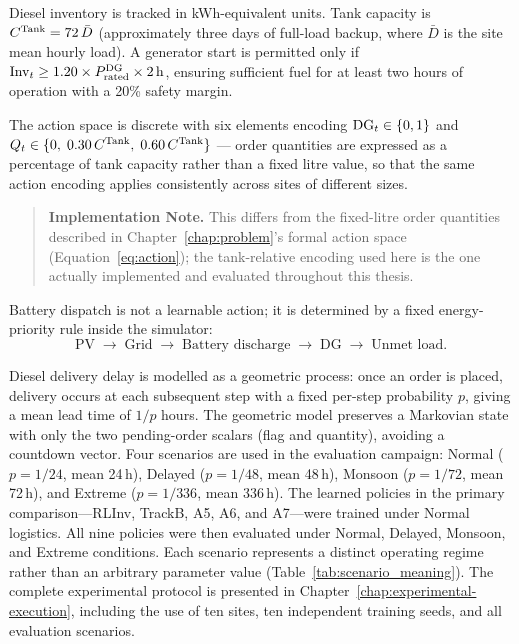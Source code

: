 Diesel inventory is tracked in kWh-equivalent units. Tank capacity is
$C^{\mathrm{Tank}} = 72\,\bar{D}$ (approximately three days of full-load backup,
where $\bar{D}$ is the site mean hourly load). A generator start is
permitted only if
$\mathrm{Inv}_t \geq 1.20 \times P_{\mathrm{rated}}^{\mathrm{DG}} \times 2\,\mathrm{h}$,
ensuring sufficient fuel for at least two hours of operation with a 20\%
safety margin.

The action space is discrete with six elements encoding
$\mathrm{DG}_t \in \{0,1\}$ and $Q_t \in \{0,\;0.30\,C^{\mathrm{Tank}},\;0.60\,C^{\mathrm{Tank}}\}$
--- order quantities are expressed as a percentage of tank capacity rather
than a fixed litre value, so that the same action encoding applies
consistently across sites of different sizes.

\begin{quote}
\textbf{Implementation Note.} This differs from the fixed-litre order
quantities described in Chapter~\ref{chap:problem}'s formal action space
(Equation~\ref{eq:action}); the tank-relative encoding used here is the
one actually implemented and evaluated throughout this thesis.
\end{quote}

Battery
dispatch is not a learnable action; it is determined by a fixed
energy-priority rule inside the simulator:
\[
\text{PV} \;\to\; \text{Grid} \;\to\; \text{Battery discharge}
\;\to\; \text{DG} \;\to\; \text{Unmet load.}
\]

Diesel delivery delay is modelled as a geometric process: once an order is
placed, delivery occurs at each subsequent step with a fixed per-step
probability $p$, giving a mean lead time of $1/p$ hours. The geometric
model preserves a Markovian state with only the two pending-order scalars
(flag and quantity), avoiding a countdown vector. Four scenarios are used
in the evaluation campaign: Normal ($p=1/24$, mean 24\,h), Delayed
($p=1/48$, mean 48\,h), Monsoon ($p=1/72$, mean 72\,h), and Extreme
($p=1/336$, mean 336\,h). The learned policies in the primary
comparison---RLInv, TrackB, A5, A6, and A7---were trained under Normal
logistics. All nine policies were then evaluated under Normal, Delayed,
Monsoon, and Extreme conditions.
Each scenario represents a distinct operating regime rather than an
arbitrary parameter value (Table~\ref{tab:scenario_meaning}).
The complete experimental protocol is presented in
Chapter~\ref{chap:experimental-execution}, including the use of ten
sites, ten independent training seeds, and all evaluation scenarios.

